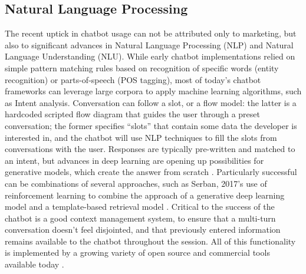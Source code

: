 \subsection{Natural Language Processing}
The recent uptick in chatbot usage can not be attributed only to marketing, but also to significant advances in Natural Language Processing (NLP) and Natural Language Understanding (NLU). 
While early chatbot implementations relied on simple pattern matching rules based on recognition of specific words (entity recognition) or parts-of-speech (POS tagging), most of today's chatbot frameworks can leverage large corpora to apply machine learning algorithms, such as Intent analysis. Conversation can follow a slot, or a flow model: the latter is a hardcoded scripted flow diagram that guides the user through a preset conversation; the former specifies ``slots'' that contain some data the developer is interested in, and the chatbot will use NLP techniques to fill the slots from conversations with the user. Responses are typically pre-written and matched to an intent, but advances in deep learning are opening up possibilities for generative models, which create the answer from scratch \cite{Gregori}. Particularly successful can be combinations of several approaches, such as Serban, 2017's use of reinforcement learning to combine the approach of a generative deep learning model and a template-based retrieval model \cite{Serban2017}. Critical to the success of the chatbot is a good context management system, to ensure that a multi-turn conversation doesn't feel disjointed, and that previously entered information remains available to the chatbot throughout the session. All of this functionality is implemented by a growing variety of open source and commercial tools available today \cite{JavierCouto}.
